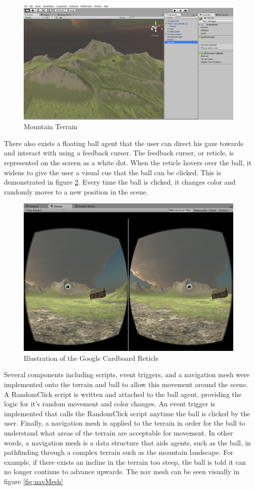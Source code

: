 \documentclass[12pt]{article}
\begin{document}
\begin{figure}[h]
    \centering
 \includegraphics[width=.8\textwidth]{Software6}
  \caption{Mountain Terrain}
  \label{fig:mountain}
 \end{figure}

\par There also exists a floating ball agent that the user can direct his gaze towards and interact with using a feedback curser.
The feedback curser, or reticle, is represented on the screen as a white dot. When the reticle hovers over the ball, it widens to give the user a visual cue that the ball can be clicked. This is demonstrated in figure \ref{fig:VRreticle}. Every time the ball is clicked, it changes color and randomly moves to a new position in the scene. %
 \begin{figure}[h]
    \centering
 \includegraphics[width=.6\textwidth]{Software4}
  \caption{Illustration of the Google Cardboard Reticle}
  \label{fig:VRreticle}
 \end{figure}
Several components including scripts, event triggers, and a navigation mesh were implemented onto the terrain and ball to allow this movement around the scene. A RandomClick script is written and attached to the ball agent, providing the logic for it's random movement and color changes. An event trigger is implemented that calls the RandomClick script anytime the ball is clicked by the user. Finally, a navigation mesh is applied to the terrain in order for the ball to understand what areas of the terrain are acceptable for movement. In other words, a navigation mesh is a data structure that aids agents, such as the ball, in pathfinding through a complex terrain such as the mountain landscape. For example, if there exists an incline in the terrain too steep, the ball is told it can no longer continue to advance upwards. The nav mesh can be seen visually in figure \ref{fig:navMesh}
\end{document}

